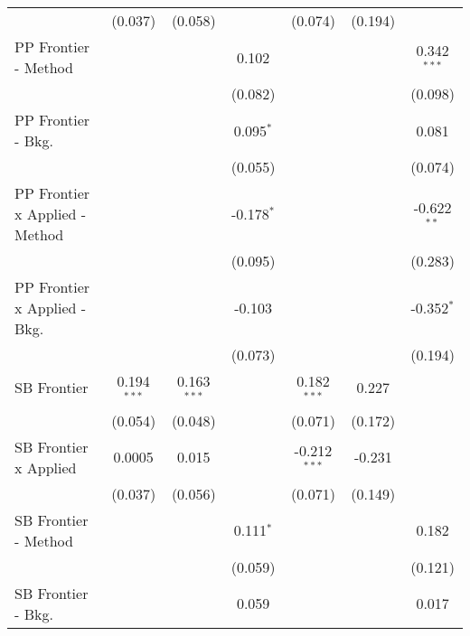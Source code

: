\begin{tabular}{lcccccc}
                                  & (0.037)        & (0.058)        &                & (0.074)        & (0.194)       &   \\   
   PP Frontier - Method           &                &                & 0.102          &                &               & 0.342$^{***}$\\   
                                  &                &                & (0.082)        &                &               & (0.098)\\   
   PP Frontier - Bkg.             &                &                & 0.095$^{*}$    &                &               & 0.081\\   
                                  &                &                & (0.055)        &                &               & (0.074)\\   
   PP Frontier x Applied - Method &                &                & -0.178$^{*}$   &                &               & -0.622$^{**}$\\   
                                  &                &                & (0.095)        &                &               & (0.283)\\   
   PP Frontier x Applied - Bkg.   &                &                & -0.103         &                &               & -0.352$^{*}$\\   
                                  &                &                & (0.073)        &                &               & (0.194)\\   
   SB Frontier                    & 0.194$^{***}$  & 0.163$^{***}$  &                & 0.182$^{***}$  & 0.227         &   \\   
                                  & (0.054)        & (0.048)        &                & (0.071)        & (0.172)       &   \\   
   SB Frontier x Applied          & 0.0005         & 0.015          &                & -0.212$^{***}$ & -0.231        &   \\   
                                  & (0.037)        & (0.056)        &                & (0.071)        & (0.149)       &   \\   
   SB Frontier - Method           &                &                & 0.111$^{*}$    &                &               & 0.182\\   
                                  &                &                & (0.059)        &                &               & (0.121)\\   
   SB Frontier - Bkg.             &                &                & 0.059          &                &               & 0.017\\   

\end{tabular}
